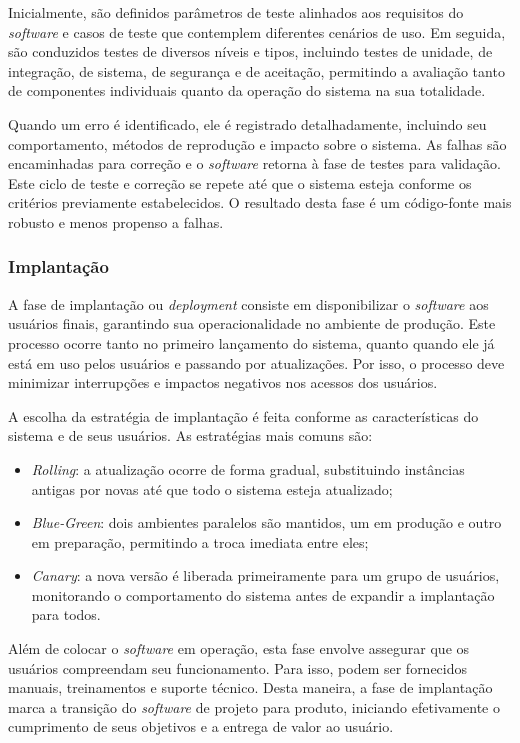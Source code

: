 Inicialmente, são definidos parâmetros de teste alinhados aos requisitos do \textit{software} e casos de teste que contemplem diferentes cenários de uso. Em seguida, são conduzidos testes de diversos níveis e tipos, incluindo testes de unidade, de integração, de sistema, de segurança e de aceitação, permitindo a avaliação tanto de componentes individuais quanto da operação do sistema na sua totalidade.

Quando um erro é identificado, ele é registrado detalhadamente, incluindo seu comportamento, métodos de reprodução e impacto sobre o sistema. As falhas são encaminhadas para correção e o \textit{software} retorna à fase de testes para validação. Este ciclo de teste e correção se repete até que o sistema esteja conforme os critérios previamente estabelecidos. O resultado desta fase é um código-fonte mais robusto e menos propenso a falhas.

\subsubsection{Implantação}

A fase de implantação ou \textit{deployment} consiste em disponibilizar o \textit{software} aos usuários finais, garantindo sua operacionalidade no ambiente de produção. Este processo ocorre tanto no primeiro lançamento do sistema, quanto quando ele já está em uso pelos usuários e passando por atualizações. Por isso, o processo deve minimizar interrupções e impactos negativos nos acessos dos usuários.

A escolha da estratégia de implantação é feita conforme as características do sistema e de seus usuários. As estratégias mais comuns são:

\begin{itemize}
    \item \textit{Rolling}: a atualização ocorre de forma gradual, substituindo instâncias antigas por novas até que todo o sistema esteja atualizado;
    \item \textit{Blue-Green}: dois ambientes paralelos são mantidos, um em produção e outro em preparação, permitindo a troca imediata entre eles;
    \item \textit{Canary}: a nova versão é liberada primeiramente para um grupo de usuários, monitorando o comportamento do sistema antes de expandir a implantação para todos.
\end{itemize}

Além de colocar o \textit{software} em operação, esta fase envolve assegurar que os usuários compreendam seu funcionamento. Para isso, podem ser fornecidos manuais, treinamentos e suporte técnico. Desta maneira, a fase de implantação marca a transição do \textit{software} de projeto para produto, iniciando efetivamente o cumprimento de seus objetivos e a entrega de valor ao usuário.

